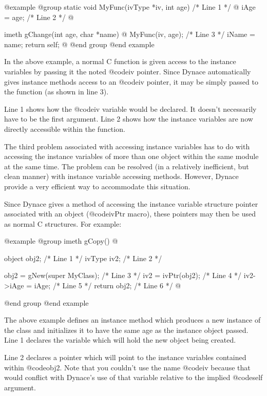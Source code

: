 @example
@group
static  void    MyFunc(ivType *iv, int age)     /*  Line 1  */
@{
        iAge = age;                             /*  Line 2  */
@}

imeth   gChange(int age, char *name)
@{
        MyFunc(iv, age);                        /*  Line 3  */
        iName = name;
        return self;
@}
@end group
@end example

In the above example, a normal C function is given access to the
instance variables by passing it the noted @code{iv} pointer.
Since Dynace automatically gives instance methods access to an
@code{iv} pointer, it may be simply passed to the function
(as shown in line 3).

Line 1 shows how the @code{iv} variable would be declared.  It doesn't
necessarily have to be the first argument.  Line 2 shows how the
instance variables are now directly accessible within the function.

The third problem associated with accessing instance variables has to do
with accessing the instance variables of more than one object within the
same module at the same time.  The problem can be resolved (in a relatively
inefficient, but clean manner) with instance variable accessing methods.
However, Dynace provide a very efficient way to accommodate this situation.

Since Dynace gives a method of accessing the instance variable
structure pointer associated with an object (@code{ivPtr} macro), these
pointers may then be used as normal C structures.  For example:

@example
@group
imeth   gCopy()
@{
        object  obj2;                   /*  Line 1  */
        ivType  iv2;                    /*  Line 2  */

        obj2 = gNew(super MyClass);     /*  Line 3  */
        iv2  = ivPtr(obj2);             /*  Line 4  */
        iv2->iAge = iAge;               /*  Line 5  */
        return obj2;                    /*  Line 6  */
@}
@end group
@end example

The above example defines an instance method which produces a new
instance of the class and initializes it to have the same age as
the instance object passed.  Line 1 declares the variable which will hold
the new object being created.

Line 2 declares a pointer which will point to the instance variables contained
within @code{obj2}.  Note that you couldn't use the name @code{iv} because
that would conflict with Dynace's use of that variable relative to the
implied @code{self} argument.

